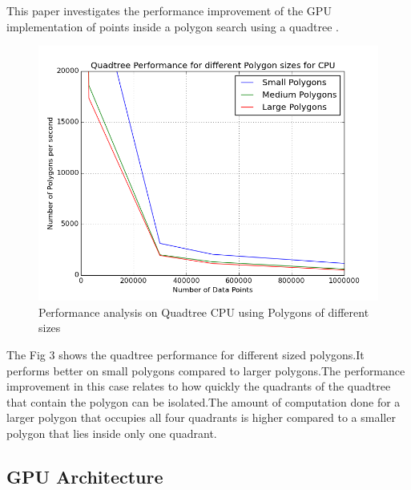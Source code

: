 \documentclass{article}
\begin{document}
This paper investigates the performance improvement of the GPU implementation of points inside a polygon search using a quadtree .


\begin{figure}[H]
\includegraphics[scale=0.6]{Different_Sized_Polygon_logScale_cpu04_10}
\caption{Performance analysis on Quadtree CPU using Polygons of different sizes}
\end{figure}

The Fig 3 shows the quadtree performance for different sized polygons.It  performs better on small polygons compared to larger polygons.The performance improvement in this case relates to how quickly the quadrants of the quadtree that contain the polygon can be isolated.The amount of computation done for a larger polygon that occupies all four quadrants is higher compared to a smaller polygon that lies inside only one quadrant.



\subsection{GPU Architecture}
\end{document}

